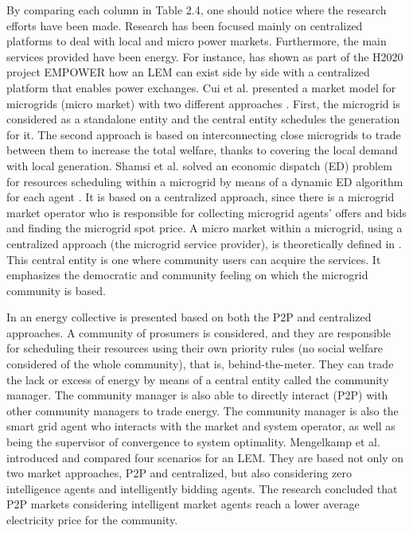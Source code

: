By comparing each column in Table 2.4, one should notice where the research efforts have been made. Research has been focused mainly on centralized platforms to deal with local and micro power markets. Furthermore, the main services provided have been energy. For instance, \cite{ilieva2016design} has shown as part of the H2020 project EMPOWER how an LEM can exist side by side with a centralized platform that enables power exchanges. Cui et al. presented a market model for microgrids (micro market) with two different approaches \cite{cui2014electricity}. First, the microgrid is considered as a standalone entity and the central entity schedules the generation for it. The second approach is based on interconnecting close microgrids to trade between them to increase the total welfare, thanks to covering the local demand with local generation. Shamsi et al. solved an economic dispatch (ED) problem for resources scheduling within a microgrid by means of a dynamic ED algorithm for each agent \cite{shamsi2015economic}. It is based on a centralized approach, since there is a microgrid market operator who
is responsible for collecting microgrid agents' offers and bids and finding the microgrid spot price. A micro market within a microgrid, using a centralized approach (the microgrid service provider), is theoretically defined in \cite{gui2017distributed}. This central entity is one where community users can acquire the services. It emphasizes the democratic and community feeling on which the microgrid community is based.

In \cite{moret2018energy} an energy collective is presented based on both the P2P and centralized approaches. A community of prosumers is considered, and they are responsible for scheduling their resources using their own priority rules (no social welfare considered of the whole community), that is, behind-the-meter. They can trade the lack or excess of energy by means of a central entity called the community manager. The community manager is also able to directly interact (P2P) with other community managers to trade energy. The community manager is also the smart grid agent who interacts with the market and system operator, as well as being the supervisor of convergence to system optimality. Mengelkamp et al. \cite{mengelkamp2017trading} introduced and compared four scenarios for an LEM. They are based not only on two market approaches, P2P and centralized, but also considering zero intelligence agents and intelligently bidding agents. The research concluded that P2P markets considering intelligent market agents reach a lower average electricity price for the community.

